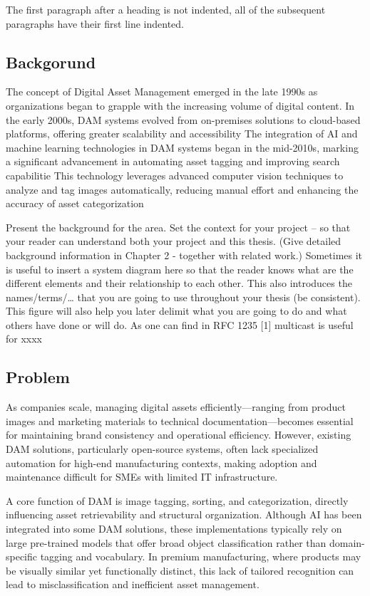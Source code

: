 \documentclass[a4paper,12pt,twocolumn]{article}
\numberwithin{figure}{section}
\numberwithin{table}{section}
\begin{document}
The first paragraph after a heading is not indented, all of the subsequent paragraphs have their first line indented.


\subsection{Backgorund}
The concept of Digital Asset Management emerged in the late 1990s as organizations began to grapple with the 
increasing volume of digital content. In the early 2000s, DAM systems evolved from on-premises solutions to cloud-based platforms, 
offering greater scalability and accessibility \citep{mccain2021}
The integration of AI and machine learning technologies in DAM systems began in the mid-2010s, 
marking a significant advancement in automating asset tagging and improving search capabilitie
This technology leverages advanced computer vision techniques to analyze and tag images automatically, 
reducing manual effort and enhancing the accuracy of asset categorization


Present the background for the area. Set the context for your project – so that your reader can
understand both your project and this thesis. (Give detailed background information in Chapter 2 -
together with related work.)
Sometimes it is useful to insert a system diagram here so that the reader knows what are the
different elements and their relationship to each other. This also introduces the names/terms/…
that you are going to use throughout your thesis (be consistent). This figure will also help you later
delimit what you are going to do and what others have done or will do.
As one can find in RFC 1235 [1] multicast is useful for xxxx

\subsection{Problem}
As companies scale, managing digital assets efficiently—ranging from product images and marketing 
materials to technical documentation—becomes essential for maintaining brand consistency and operational efficiency.
However, existing DAM solutions, particularly open-source systems, often lack specialized 
automation for high-end manufacturing contexts, making adoption and maintenance difficult for SMEs with 
limited IT infrastructure.
\vspace{0.3cm}

A core function of DAM is image tagging, sorting, and categorization, directly influencing asset 
retrievability and structural organization. Although AI has been integrated into some DAM solutions,
 these implementations typically rely on large pre-trained models that offer broad object classification 
 rather than domain-specific tagging and vocabulary. In premium manufacturing, where products may be visually similar yet functionally 
 distinct, this lack of tailored recognition can lead to misclassification and inefficient asset management.
\vspace{0.3cm}
\end{document}
